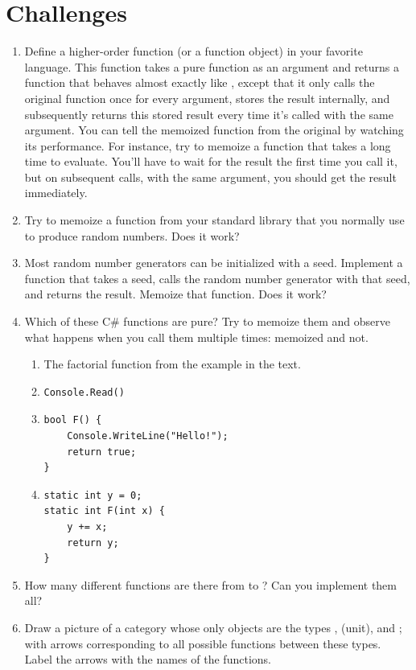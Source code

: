 \section{Challenges}

\begin{enumerate}
  \tightlist
  \item
        Define a higher-order function (or a function object) 
        in your favorite language. This function takes a pure function
         as an argument and returns a function that behaves almost
        exactly like , except that it only calls the original
        function once for every argument, stores the result internally, and
        subsequently returns this stored result every time it's called with
        the same argument. You can tell the memoized function from the
        original by watching its performance. For instance, try to memoize a
        function that takes a long time to evaluate. You'll have to wait for
        the result the first time you call it, but on subsequent calls, with
        the same argument, you should get the result immediately.
  \item
        Try to memoize a function from your standard library that you normally
        use to produce random numbers. Does it work?
  \item
        Most random number generators can be initialized with a seed.
        Implement a function that takes a seed, calls the random number
        generator with that seed, and returns the result. Memoize that
        function. Does it work?
  \item
        Which of these C\# functions are pure? Try to memoize them and observe
        what happens when you call them multiple times: memoized and not.

        \begin{enumerate}
          \tightlist
          \item
                The factorial function from the example in the text.
          \item
                \begin{verbatim}
Console.Read()
\end{verbatim}
          \item
                \begin{verbatim}
bool F() {
    Console.WriteLine("Hello!");
    return true;
}
\end{verbatim}
          \item
                \begin{verbatim}
static int y = 0;
static int F(int x) {
    y += x;
    return y;
}
\end{verbatim}
        \end{enumerate}
  \item
        How many different functions are there from  to
        ? Can you implement them all?
  \item
        Draw a picture of a category whose only objects are the types
        , \code{()} (unit), and ; with arrows
        corresponding to all possible functions between these types. Label the
        arrows with the names of the functions.
\end{enumerate}
